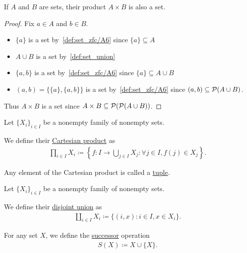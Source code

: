 \begin{proposition}\label{def:binary_cartesian_product_is_set}
  If $A$ and $B$ are sets, their product $A \times B$ is also a set.
\end{proposition}
\begin{proof}
  Fix $a \in A$ and $b \in B$.
  \begin{itemize}
    \item $\{ a \}$ is a set by~\ref{def:set_zfc/A6} since $\{ a \} \subseteq A$
    \item $A \cup B$ is a set by~\cref{def:set_union}
    \item $\{ a, b \}$ is a set by~\ref{def:set_zfc/A6} since $\{ a \} \subseteq A \cup B$
    \item $(a, b) = \{ \{ a \}, \{ a, b \} \}$ is a set by~\ref{def:set_zfc/A6} since $(a, b) \subseteq \operatorname{\mathcal P}(A \cup B)$.
  \end{itemize}

  Thus $A \times B$ is a set since $A \times B \subseteq \operatorname{\mathcal P}(\operatorname{\mathcal P}(A \cup B))$.
\end{proof}

\begin{definition}\label{def:cartesian_product}\cite[54]{Enderton1977}
  Let $\{ X_i \}_{i \in I}$ be a nonempty family of nonempty sets.

  We define their \ul{Cartesian product} as
  \begin{align*}
    \prod_{i \in I} X_i \coloneqq \left\{ f: I \to \bigcup_{j \in I} X_j \colon \forall j \in I, f(j) \in X_j \right\}.
  \end{align*}

  Any element of the Cartesian product is called a \ul{tuple}.
\end{definition}

\begin{definition}\label{def:disjoint_union}
  Let $\{ X_i \}_{i \in I}$ be a nonempty family of nonempty sets.

  We define their \ul{disjoint union} as
  \begin{align*}
    \coprod_{i \in I} X_i \coloneqq \{ (i, x) \colon i \in I, x \in X_i \}.
  \end{align*}
\end{definition}

\begin{definition}\label{def:successor_operator}\cite[68]{Enderton1977}
  For any set $X$, we define the \ul{successor} operation
  \begin{align*}
    S(X) \coloneqq X \cup \{ X \}.
  \end{align*}
\end{definition}

